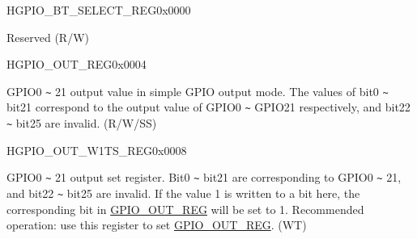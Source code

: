 \begin{register}{H}{GPIO\_BT\_SELECT\_REG}{0x0000}\label{regdesc:GPIOBTSELECTREG}
%
\regnewline%
\begin{regdesc}\begin{reglist}
\label{fielddesc:GPIOBTSEL}\item [GPIO\_BT\_SEL] Reserved (R/W)
\end{reglist}\end{regdesc}
\end{register}


\begin{register}{H}{GPIO\_OUT\_REG}{0x0004}\label{regdesc:GPIOOUTREG}
%
%
\regnewline%
\begin{regdesc}\begin{reglist}
\label{fielddesc:GPIOOUTDATAORIG}\item [GPIO\_OUT\_DATA\_ORIG] GPIO0 \verb+~+ 21 output value in simple GPIO output mode. The values of bit0 \verb+~+ bit21 correspond to the output value of GPIO0 \verb+~+ GPIO21 respectively, and bit22 \verb+~+ bit25 are invalid. (R/W/SS)
\end{reglist}\end{regdesc}
\end{register}


\begin{register}{H}{GPIO\_OUT\_W1TS\_REG}{0x0008}\label{regdesc:GPIOOUTW1TSREG}
%
%
\regnewline%
\begin{regdesc}\begin{reglist}
\label{fielddesc:GPIOOUTW1TS}\item [GPIO\_OUT\_W1TS] GPIO0 \verb+~+ 21 output set register. Bit0 \verb+~+ bit21 are corresponding to GPIO0 \verb+~+ 21, and bit22 \verb+~+ bit25 are invalid. If the value 1 is written to a bit here, the corresponding bit in \hyperref[regdesc:GPIOOUTREG]{GPIO\_OUT\_REG} will be set to 1. Recommended operation: use this register to set \hyperref[regdesc:GPIOOUTREG]{GPIO\_OUT\_REG}. (WT)
\end{reglist}\end{regdesc}
\end{register}

